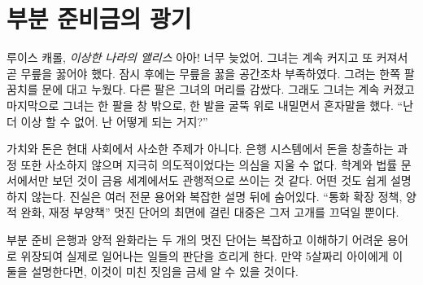 \chapter{부분 준비금의 광기}
\label{les:13}

\begin{chapquote}{루이스 캐롤, \textit{이상한 나라의 앨리스}}
	아아! 너무 늦었어. 그녀는 계속 커지고 또 커져서 곧 무릎을 꿇어야 했다.
	잠시 후에는 무릎을 꿇을 공간조차 부족하였다. 그려는 한쪽 팔꿈치를 문에 대고 누웠다. 다른 팔은 그녀의
	머리를 감쌌다. 그래도 그녀는 계속 커졌고 마지막으로 그녀는 한 팔을 창 밖으로, 한 발을 굴뚝 위로 내밀면서
	혼자말을 했다. \enquote{난 더 이상 할 수 없어. 난 어떻게 되는 거지?}
\end{chapquote}

\begin{comment}
	Value and money aren't trivial topics, especially in today's times. The
	process of money creation in our banking system is equally non-trivial,
	and I can't shake the feeling that this is deliberately so. What I have
	previously only encountered in academia and legal texts seems to be
	common practice in the financial world as well: nothing is explained in
	simple terms, not because it is truly complex, but because the truth is
	hidden behind layers and layers of jargon and \textit{apparent} complexity.
	\enquote{Expansionary monetary policy, quantitative easing, fiscal stimulus to
		the economy.} The audience nods along in agreement, hypnotized by the
	fancy words.
\end{comment}
가치와 돈은 현대 사회에서 사소한 주제가 아니다. 
은행 시스템에서 돈을 창출하는 과정 또한 사소하지 않으며 지극히 의도적이었다는 의심을 지울 수 없다. 
학계와 법률 문서에서만 보던 것이 금융 세계에서도 관행적으로 쓰이는 것 같다.
어떤 것도 쉽게 설명하지 않는다. 진실은 여러 전문 용어와 복잡한 설명 뒤에 숨어있다.
\enquote{통화 확장 정책, 양적 완화, 재정 부양책} 멋진 단어의 최면에 걸린 대중은
그저 고개를 끄덕일 뿐이다.

\begin{comment}
	Fractional reserve banking and quantitative easing are two of those
	fancy words, obfuscating what is really happening by masking it as
	complex and difficult to understand. If you would explain them to a
	five-year-old, the insanity of both will become apparent quickly.
\end{comment}
부분 준비 은행과 양적 완화라는 두 개의 멋진 단어는 
복잡하고 이해하기 어려운 용어로 위장되여 실제로 일어나는 일들의 판단을 흐리게 한다. 
만약 5살짜리 아이에게 이 둘을 설명한다면, 이것이 미친 짓임을 금세 알 수 있을 것이다.


